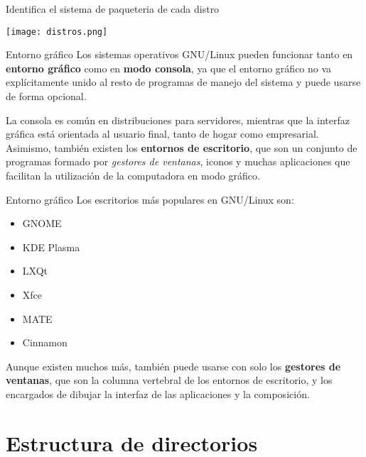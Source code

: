 \begin{frame}[c]{Identifica el sistema de paqueteria de cada distro}
  \begin{center}
    \texttt{[image: distros.png]}
  \end{center}
\end{frame}

\begin{frame}[c]{Entorno gráfico}
  Los sistemas operativos GNU/Linux pueden funcionar tanto en
  \textbf{entorno gráfico} como en \textbf{modo consola}, ya que el entorno
  gráfico no va explícitamente unido al resto de programas de manejo del
  sistema y puede usarse de forma opcional.

  \vspace{\baselineskip}
  La consola es común en distribuciones para servidores, mientras que la
  interfaz gráfica está orientada al usuario final, tanto de hogar como
  empresarial. Asimismo, también existen los \textbf{entornos de escritorio},
  que son un conjunto de programas formado por \emph{gestores de ventanas},
  iconos y muchas aplicaciones que facilitan la utilización de la
  computadora en modo gráfico.

\end{frame}

\begin{frame}[c]{Entorno gráfico}
  Los escritorios más populares en GNU/Linux son:

  \begin{itemize}
    \item GNOME
    \item KDE Plasma
    \item LXQt
    \item Xfce
    \item MATE
    \item Cinnamon
  \end{itemize}

  Aunque existen muchos más, también puede usarse con solo los
  \textbf{gestores de ventanas}, que son la columna vertebral de los entornos
  de escritorio, y los encargados de dibujar la interfaz de las aplicaciones
  y la composición.
\end{frame}

\section{Estructura de directorios}

